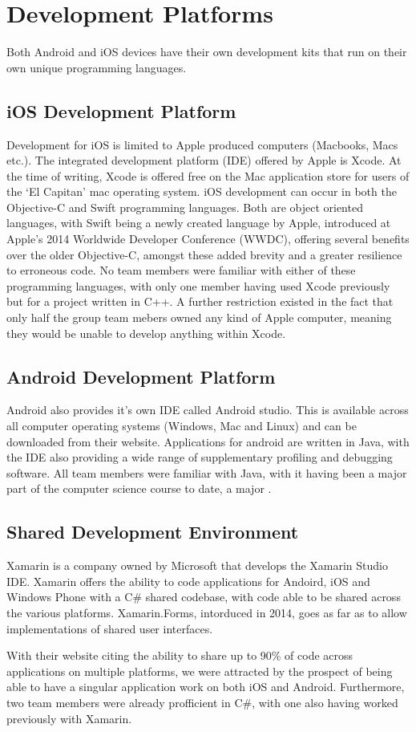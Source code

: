 \documentclass[main.tex]{subfiles}
\begin{document}
\section{Development Platforms}

Both Android and iOS devices have their own development kits that run on their own unique programming languages.

\subsection{iOS Development Platform}
Development for iOS is limited to Apple produced computers (Macbooks, Macs etc.). The integrated development platform (IDE) offered by Apple is Xcode. At the time of writing, Xcode is offered free on the Mac application store for users of the `El Capitan' mac operating system. iOS development can occur in both the Objective-C and Swift programming languages. Both are object oriented languages, with Swift being a newly created language by Apple, introduced at Apple's 2014 Worldwide Developer Conference (WWDC), offering several benefits over the older Objective-C, amongst these added brevity and a greater resilience to erroneous code. No team members were familiar with either of these programming languages, with only one member having used Xcode previously but for a project written in C++. A further restriction existed in the fact that only half the group team mebers owned any kind of Apple computer, meaning they would be unable to develop anything within Xcode.

\subsection{Android Development Platform}

Android also provides it's own IDE called Android studio. This is available across all computer operating systems (Windows, Mac and Linux) and can be downloaded from their website. Applications for android are written in Java, with the IDE also providing a wide range of supplementary profiling and debugging software. All team members were familiar with Java, with it having been a major part of the computer science course to date, a major .

\subsection{Shared Development Environment}

Xamarin is a company owned by Microsoft that develops the Xamarin Studio IDE. Xamarin offers the ability to code applications for Andoird, iOS and Windows Phone with a C\# shared codebase, with code able to be shared across the various platforms. Xamarin.Forms, intorduced in 2014, goes as far as to allow implementations of shared user interfaces.

With their website citing the ability to share up to 90\% of code across applications on multiple platforms, we were attracted by the prospect of being able to have a singular application work on both iOS and Android. Furthermore, two team members were already profficient in C\#, with one also having worked previously with Xamarin.
 


 
\end{document}
